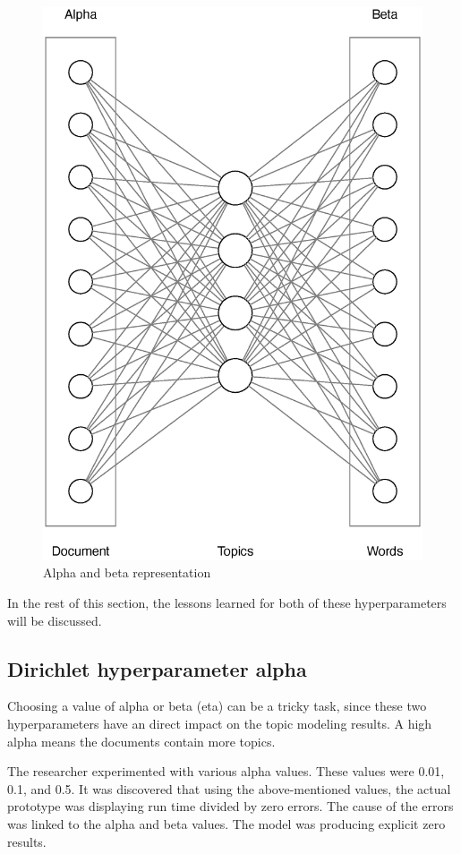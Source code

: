 \begin{figure}[htbp]
\centering
\includegraphics[width=12cm]{./figures/alpha1.eps}
\caption{Alpha and beta representation}
\label{fig:alphaandbeta}
\end{figure}

In the rest of this section, the lessons learned for both of these hyperparameters will be discussed.

\subsection{Dirichlet hyperparameter alpha}

Choosing a value of alpha or beta (eta) can be a tricky task, since these two hyperparameters have an direct impact on the topic modeling results. A high alpha means the documents contain more topics.

The researcher experimented with various alpha values. These values were 0.01, 0.1, and 0.5. It was discovered that using the above-mentioned values, the actual prototype was displaying run time divided by zero errors. The cause of the errors was linked to the alpha and beta values. The model was producing explicit zero results. 

